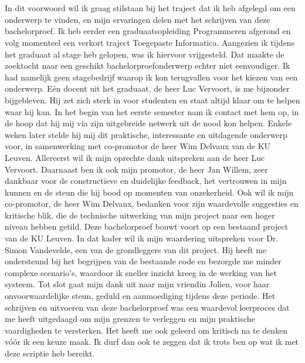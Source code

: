 
\chapter*{}%
\label{ch:voorwoord}

In dit voorwoord wil ik graag stilstaan bij het traject dat ik heb afgelegd om een onderwerp te vinden, en mijn ervaringen delen met het schrijven van deze bachelorproef.
Ik heb eerder een graduaatsopleiding Programmeren afgerond en volg momenteel een verkort traject Toegepaste Informatica. Aangezien ik tijdens het graduaat al stage heb gelopen, was ik hiervoor vrijgesteld. Dat maakte de zoektocht naar een geschikt bachelorproefonderwerp echter niet eenvoudiger. Ik had namelijk geen stagebedrijf waarop ik kon terugvallen voor het kiezen van een onderwerp.
Eén docent uit het graduaat, de heer Luc Vervoort, is me bijzonder bijgebleven. Hij zet zich sterk in voor studenten en staat altijd klaar om te helpen waar hij kan. In het begin van het eerste semester nam ik contact met hem op, in de hoop dat hij mij via zijn uitgebreide netwerk uit de nood kon helpen. Enkele weken later stelde hij mij dit praktische, interessante en uitdagende onderwerp voor, in samenwerking met co-promotor de heer Wim Delvaux van de KU Leuven.
Allereerst wil ik mijn oprechte dank uitspreken aan de heer Luc Vervoort. Daarnaast ben ik ook mijn promotor, de heer Jan Willem, zeer dankbaar voor de constructieve en duidelijke feedback, het vertrouwen in mijn kunnen en de steun die hij bood op momenten van onzekerheid. Ook wil ik mijn co-promotor, de heer Wim Delvaux, bedanken voor zijn waardevolle suggesties en kritische blik, die de technische uitwerking van mijn project naar een hoger niveau hebben getild. Deze bachelorproef bouwt voort op een bestaand project van de KU Leuven. In dat kader wil ik mijn waardering uitspreken voor Dr. Simon Vandevelde, een van de grondleggers van dit project. Hij heeft me ondersteund bij het begrijpen van de bestaande code en bezorgde me minder complexe scenario’s, waardoor ik sneller inzicht kreeg in de werking van het systeem. Tot slot gaat mijn dank uit naar mijn vriendin Jolien, voor haar onvoorwaardelijke steun, geduld en aanmoediging tijdens deze periode.
Het schrijven en uitvoeren van deze bachelorproef was een waardevol leerproces dat me heeft uitgedaagd om mijn grenzen te verleggen en mijn praktische vaardigheden te versterken. Het heeft me ook geleerd om kritisch na te denken vóór ik een keuze maak.
Ik durf dan ook te zeggen dat ik trots ben op wat ik met deze scriptie heb bereikt.
